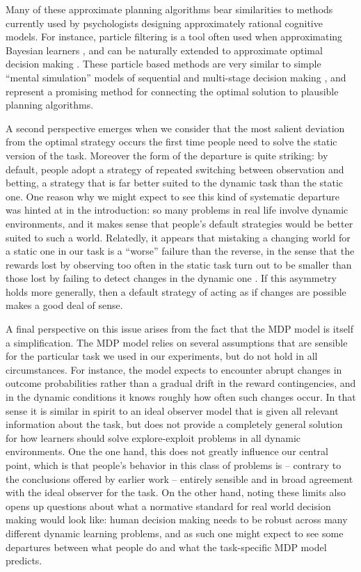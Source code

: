 \documentclass[authoryear]{elsarticle}
\begin{document}
Many of these approximate planning algorithms bear similarities to methods currently used by psychologists designing approximately rational cognitive models. For instance, particle filtering is a tool often used when approximating Bayesian learners \citep[e.g.,][]{sanborn_rational_2010,brown_detecting_2009}, and can be naturally extended to approximate optimal decision making  \citep{silver_monte-carlo_2010}. These particle based methods are very similar to simple ``mental simulation'' models of sequential and multi-stage decision making \citep[e.g.,][]{hotaling_dft-d:_2012}, and represent  a promising method for connecting the optimal solution to plausible planning algorithms.

A second perspective emerges when we consider that the most salient deviation from the optimal strategy occurs the first time people need to solve the static version of the task. Moreover the form of the departure is quite striking: by default, people adopt a strategy of repeated switching between observation and betting, a strategy that is far better suited to the dynamic task than the static one. One reason why we might expect to  see this kind of systematic departure was hinted at in the introduction:  so many problems in real life involve dynamic environments, and it makes sense that people's default strategies would be better suited to such a world. Relatedly, it appears that mistaking a changing world for a static one in our task is a ``worse'' failure than the reverse, in the sense that the rewards lost by observing too often in the static task turn out to be smaller than those lost by failing to detect changes in the dynamic one \citep[see][for discussion]{navarro_information_2014}. If this asymmetry holds more generally, then a default strategy of acting as if changes are possible makes a good deal of sense.

A final perspective on this issue arises from the fact that the MDP model is itself a simplification. The MDP model relies on several assumptions that are sensible for the particular task we used in our experiments, but do not hold in all circumstances. For instance, the model expects to encounter abrupt changes in outcome probabilities rather than a gradual drift in the reward contingencies, and in the dynamic conditions it knows roughly how often such changes occur. In that sense it is similar in spirit to an ideal observer model that is given all relevant information about the task, but does not provide a completely general solution for how learners should solve explore-exploit problems in all dynamic environments. One the one hand, this does not greatly influence our central point, which is that people's behavior in this class of problems is -- contrary to the conclusions offered by earlier work -- entirely sensible and in broad agreement with the ideal observer for the task. On the other hand, noting these limits also opens up questions about what a normative standard for real world decision making would look like: human decision making needs to be robust across many different dynamic learning problems, and as such one might expect to see some departures between what people do and what the task-specific MDP model predicts.
\end{document}
